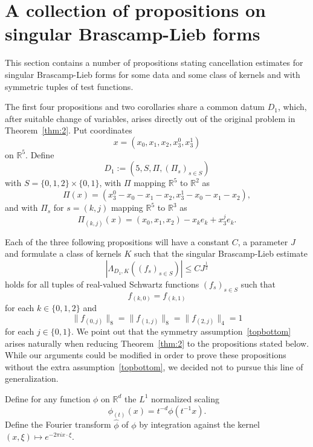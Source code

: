 \documentclass[12pt,reqno]{amsart}
\theoremstyle{plain}
\theoremstyle{definition}
\numberwithin{equation}{section}
\newcommand{\R}{{\mathbb R}}
\begin{document}
\section{A collection of propositions on singular Brascamp-Lieb forms}
\label{sblsection}
This section contains a number of propositions stating cancellation estimates for 
singular Brascamp-Lieb forms for some data and some 
class of kernels and  with symmetric tuples of test functions. 

The first four propositions and two corollaries share a common datum $D_1$, which, 
after suitable change of variables, arises directly out of the original problem in Theorem~\ref{thm:2}.
Put coordinates \[x=(x_0,x_1,x_2,x_3^0,x_3^1)\] on $\R^5$.
Define 
\begin{equation}\label{defd1}
D_1:=(5,S, \Pi,(\Pi_s)_{s\in S})    
\end{equation}
 with 
$S=\{0,1,2\}\times \{0,1\}$, with $\Pi$ mapping $\R^5$ to $\R^2$ 
as
\[\Pi(x)=(x_3^0-x_0-x_1-x_2, x_3^1-x_0-x_1-x_2),\]
and with $\Pi_s$ for $s=(k,j)$ mapping $\R^5$ to $\R^3$ as
\[\Pi_{(k,j)}(x)=(x_0,x_1,x_2)-x_ke_k+ x_3^j e_k.\]

Each of the three following propositions will have a constant $C$, a 
parameter $J$ and formulate a class of kernels $K$ such that the 
singular Brascamp-Lieb estimate 
\begin{equation}\label{lambdabd}
|\Lambda_{D_1,K} ((f_s)_{s\in S})|\le CJ^{\frac 12}
\end{equation}
holds for all tuples of real-valued Schwartz functions $(f_{s})_{s\in S}$
such that
\begin{equation}\label{topbottom}
f_{(k,0)}=f_{(k,1)}
\end{equation}
for each $k\in \{0,1,2\}$
and 
\begin{equation}\label{normal1}
\|f_{(0,j)}\|_{8}=\|f_{(1,j)}\|_{8} =\|f_{(2,j)}\|_{4} =1
\end{equation}
for each $j\in \{0,1\}$.  We point out that the symmetry assumption~\eqref{topbottom} arises naturally when reducing Theorem~\ref{thm:2} to the propositions stated below. While our arguments could be modified in order to prove these propositions without the extra assumption~\eqref{topbottom}, we decided not to pursue this line of generalization.

Define for any function $\phi$ on $\R^d$ the $L^1$ normalized scaling
\begin{equation*}%
\phi_{(t)}(x)=t^{-d} \phi(t^{-1}x).
\end{equation*}
Define the Fourier transform $\widehat{\phi}$ of  $\phi$ 
by integration against the kernel $(x,\xi) \mapsto e^{-2\pi i x \cdot \xi}$.
\end{document}
